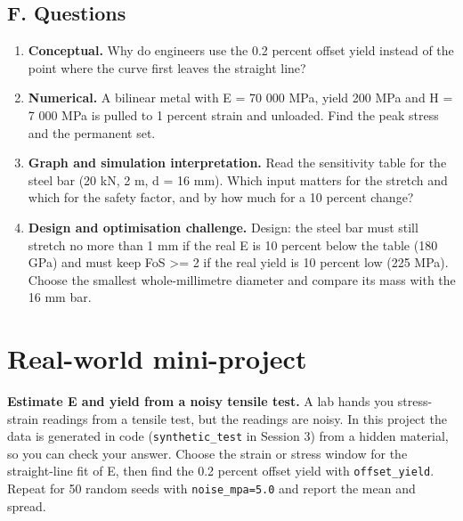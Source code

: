 \documentclass[11pt,a4paper]{article}
\begin{document}
\subsection*{F. Questions}
\begin{enumerate}[nosep]
\item \textbf{Conceptual.} Why do engineers use the 0.2 percent offset yield instead of the point where the curve first leaves the straight line?
\item \textbf{Numerical.} A bilinear metal with E = 70 000 MPa, yield 200 MPa and H = 7 000 MPa is pulled to 1 percent strain and unloaded. Find the peak stress and the permanent set.
\item \textbf{Graph and simulation interpretation.} Read the sensitivity table for the steel bar (20 kN, 2 m, d = 16 mm). Which input matters for the stretch and which for the safety factor, and by how much for a 10 percent change?
\item \textbf{Design and optimisation challenge.} Design: the steel bar must still stretch no more than 1 mm if the real E is 10 percent below the table (180 GPa) and must keep FoS \textgreater{}= 2 if the real yield is 10 percent low (225 MPa). Choose the smallest whole-millimetre diameter and compare its mass with the 16 mm bar.
\end{enumerate}

\section{Real-world mini-project}
\textbf{Estimate E and yield from a noisy tensile test.} A lab hands you stress-strain readings from a tensile test, but the readings are noisy. In this project the data is generated in code (\texttt{synthetic\_test} in Session 3) from a hidden material, so you can check your answer. Choose the strain or stress window for the straight-line fit of E, then find the 0.2 percent offset yield with \texttt{offset\_yield}. Repeat for 50 random seeds with \texttt{noise\_mpa=5.0} and report the mean and spread.
\end{document}
